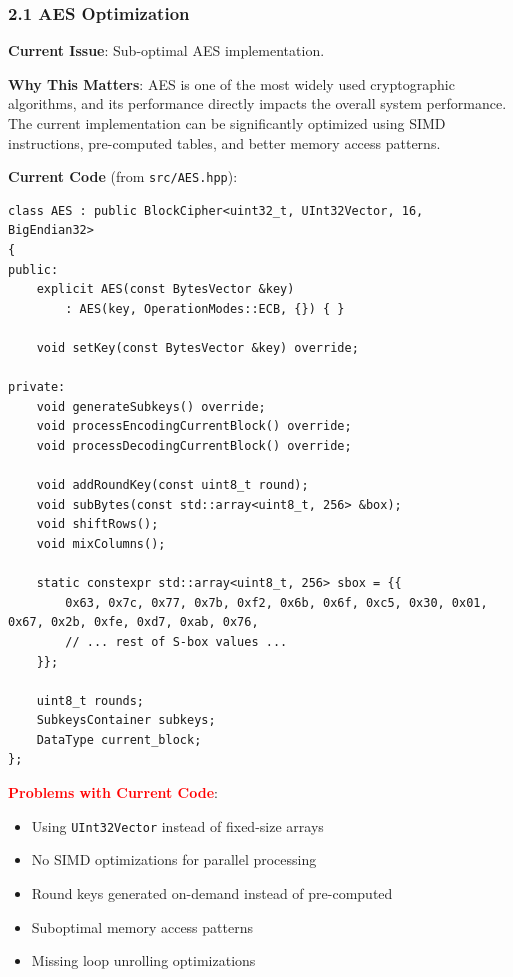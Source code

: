 \documentclass[11pt,a4paper]{article}
\begin{document}
\subsubsection{2.1 AES Optimization}

\textbf{Current Issue}: Sub-optimal AES implementation.

\textbf{Why This Matters}: AES is one of the most widely used cryptographic algorithms, and its performance directly impacts the overall system performance. The current implementation can be significantly optimized using SIMD instructions, pre-computed tables, and better memory access patterns.

\textbf{Current Code} (from \texttt{src/AES.hpp}):
\begin{lstlisting}
class AES : public BlockCipher<uint32_t, UInt32Vector, 16, BigEndian32>
{
public:
    explicit AES(const BytesVector &key)
        : AES(key, OperationModes::ECB, {}) { }

    void setKey(const BytesVector &key) override;

private:
    void generateSubkeys() override;
    void processEncodingCurrentBlock() override;
    void processDecodingCurrentBlock() override;

    void addRoundKey(const uint8_t round);
    void subBytes(const std::array<uint8_t, 256> &box);
    void shiftRows();
    void mixColumns();

    static constexpr std::array<uint8_t, 256> sbox = {{
        0x63, 0x7c, 0x77, 0x7b, 0xf2, 0x6b, 0x6f, 0xc5, 0x30, 0x01, 0x67, 0x2b, 0xfe, 0xd7, 0xab, 0x76,
        // ... rest of S-box values ...
    }};

    uint8_t rounds;
    SubkeysContainer subkeys;
    DataType current_block;
};
\end{lstlisting}

\textcolor{red}{\textbf{Problems with Current Code}}:
\begin{itemize}
    \item Using \texttt{UInt32Vector} instead of fixed-size arrays
    \item No SIMD optimizations for parallel processing
    \item Round keys generated on-demand instead of pre-computed
    \item Suboptimal memory access patterns
    \item Missing loop unrolling optimizations
\end{itemize}
\end{document}
